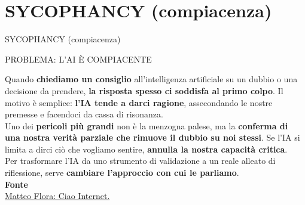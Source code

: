 \documentclass[aspectratio=1610]{beamer}
\begin{document}
\section{SYCOPHANCY (compiacenza)}

\begin{frame}{SYCOPHANCY (compiacenza)}
    \begin{alertblock}{PROBLEMA: L'AI È COMPIACENTE}
        \begin{minipage}{0.98\linewidth}
            \justifying
            Quando \textbf{chiediamo un consiglio} all'intelligenza artificiale su un dubbio o una decisione 
            da prendere, \textbf{la risposta spesso ci soddisfa al primo colpo}. Il motivo è semplice: 
            \textbf{l'IA tende a darci ragione}, assecondando le nostre premesse e facendoci da cassa di 
            risonanza.\\
            Uno dei \textbf{pericoli più grandi} non è la menzogna palese, ma la \textbf{conferma di una nostra 
            verità parziale che rimuove il dubbio su noi stessi}. Se l'IA si limita a dirci ciò che 
            vogliamo sentire, \textbf{annulla la nostra capacità critica}.\\
            Per trasformare l'IA da uno strumento di validazione a un reale alleato di riflessione, 
            serve \textbf{cambiare l'approccio con cui le parliamo}.\\
            \bigskip
            \tiny{\textbf{Fonte}}\\
            \tiny{\href{https://www.matteoflora.com/}{Matteo Flora: Ciao Internet.}}
        \end{minipage}
    \end{alertblock}
\end{frame}
\end{document}
